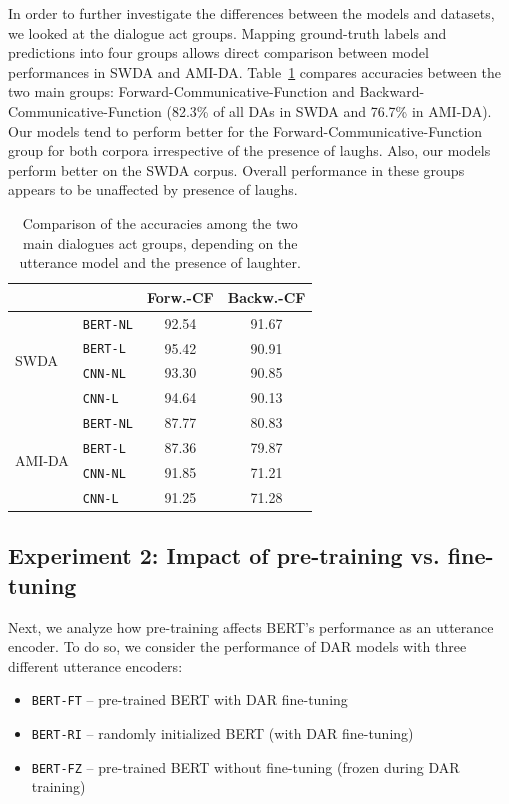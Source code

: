 \documentclass[11pt,a4paper]{article}
\begin{document}
In order to further investigate the differences between the models and datasets, we looked at the dialogue act groups.
Mapping ground-truth labels and predictions into four groups allows direct comparison between model performances in SWDA and AMI-DA.
Table~\ref{table:laughter-group-acc} compares accuracies between the two main groups: Forward-Communicative-Function and Backward-Communicative-Function (82.3\% of all DAs in SWDA and 76.7\% in AMI-DA).
Our models tend to perform better for the Forward-Communicative-Function group for both corpora irrespective of the presence of laughs.
Also, our models perform better on the SWDA corpus.
Overall performance in these groups appears to be unaffected by presence of laughs.

\begin{table}
  \centering
  \begin{tabular}{@{}llcc@{}}
    \toprule
    &                  & Forw.-CF  & Backw.-CF   \\ \midrule
    \multirow{4}{*}{SWDA}    &\texttt{BERT-NL}  & 92.54 & 91.67       \\ 
                             &\texttt{BERT-L}   & 95.42 & 90.91       \\ 
                             &\texttt{CNN-NL}   & 93.30 & 90.85        \\
                             &\texttt{CNN-L}    & 94.64 & 90.13        \\ \midrule
    \multirow{4}{*}{AMI-DA}  &\texttt{BERT-NL}  & 87.77 & 80.83       \\ 
                             &\texttt{BERT-L}   & 87.36 & 79.87       \\
                             &\texttt{CNN-NL}   & 91.85 & 71.21        \\
                             &\texttt{CNN-L}    & 91.25 & 71.28        \\    \bottomrule
  \end{tabular}
  \caption{Comparison of the accuracies among the two main dialogues act groups, depending on the utterance model and the presence of laughter.}
  \label{table:laughter-group-acc}
\end{table}


\subsection{Experiment 2: Impact of pre-training vs. fine-tuning} \label{sec:experiment2} %
Next, we analyze how pre-training affects BERT's performance as an utterance encoder.
To do so, we consider the performance of DAR models with three different utterance encoders:
\begin{itemize}
  \item \texttt{BERT-FT} -- pre-trained BERT with DAR fine-tuning 
  \item \texttt{BERT-RI} -- randomly initialized BERT (with DAR fine-tuning)
  \item \texttt{BERT-FZ} -- pre-trained BERT without fine-tuning (frozen during DAR training)
\end{itemize}
\end{document}
